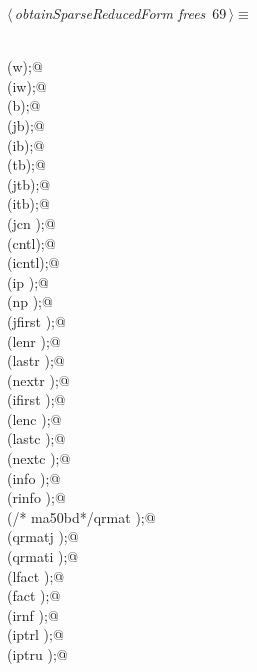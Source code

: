 \documentclass{article}
\begin{document}
\begin{flushleft} \small
\begin{minipage}{\linewidth}\label{scrap106}\raggedright\small
{} $\langle\,${\itshape obtainSparseReducedForm frees}\nobreak\ {\footnotesize {69}}$\,\rangle\equiv$
\vspace{-1ex}
\begin{list}{}{} \item
\mbox{}\verb@@\\
\mbox{}\verb@free(w);@\\
\mbox{}\verb@free(iw);@\\
\mbox{}\verb@free(b);@\\
\mbox{}\verb@free(jb);@\\
\mbox{}\verb@free(ib);@\\
\mbox{}\verb@free(tb);@\\
\mbox{}\verb@free(jtb);@\\
\mbox{}\verb@free(itb);@\\
\mbox{}\verb@free(jcn );@\\
\mbox{}\verb@free(cntl);@\\
\mbox{}\verb@free(icntl);@\\
\mbox{}\verb@free(ip );@\\
\mbox{}\verb@free(np );@\\
\mbox{}\verb@free(jfirst );@\\
\mbox{}\verb@free(lenr );@\\
\mbox{}\verb@free(lastr );@\\
\mbox{}\verb@free(nextr );@\\
\mbox{}\verb@free(ifirst );@\\
\mbox{}\verb@free(lenc );@\\
\mbox{}\verb@free(lastc );@\\
\mbox{}\verb@free(nextc );@\\
\mbox{}\verb@free(info );@\\
\mbox{}\verb@free(rinfo );@\\
\mbox{}\verb@free(/* ma50bd*/qrmat );@\\
\mbox{}\verb@free(qrmatj );@\\
\mbox{}\verb@free(qrmati );@\\
\mbox{}\verb@free(lfact );@\\
\mbox{}\verb@free(fact );@\\
\mbox{}\verb@free(irnf );@\\
\mbox{}\verb@free(iptrl );@\\
\mbox{}\verb@free(iptru );@\\

\end{list}
\end{minipage}
\end{flushleft}
\end{document}
